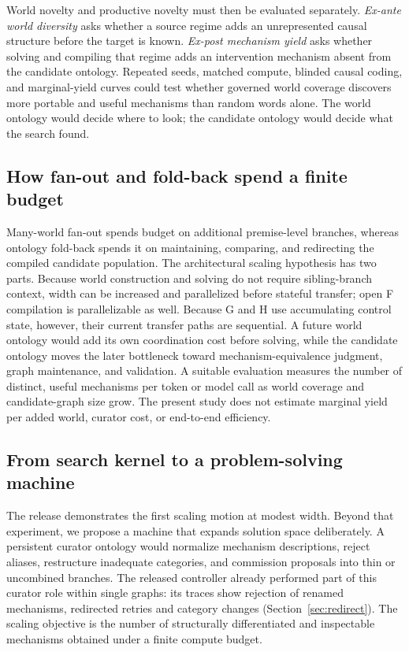 \documentclass[11pt,a4paper]{article}
\begin{document}
World novelty and productive novelty must then be evaluated separately. \emph{Ex-ante world diversity} asks whether a source regime adds an unrepresented causal structure before the target is known. \emph{Ex-post mechanism yield} asks whether solving and compiling that regime adds an intervention mechanism absent from the candidate ontology. Repeated seeds, matched compute, blinded causal coding, and marginal-yield curves could test whether governed world coverage discovers more portable and useful mechanisms than random words alone. The world ontology would decide where to look; the candidate ontology would decide what the search found.

\subsection{How fan-out and fold-back spend a finite budget}
\label{sec:budget}

Many-world fan-out spends budget on additional premise-level branches, whereas ontology fold-back spends it on maintaining, comparing, and redirecting the compiled candidate population. The architectural scaling hypothesis has two parts. Because world construction and solving do not require sibling-branch context, width can be increased and parallelized before stateful transfer; open F compilation is parallelizable as well. Because G and H use accumulating control state, however, their current transfer paths are sequential. A future world ontology would add its own coordination cost before solving, while the candidate ontology moves the later bottleneck toward mechanism-equivalence judgment, graph maintenance, and validation. A suitable evaluation measures the number of distinct, useful mechanisms per token or model call as world coverage and candidate-graph size grow. The present study does not estimate marginal yield per added world, curator cost, or end-to-end efficiency.

\subsection{From search kernel to a problem-solving machine}
\label{sec:machine}

The release demonstrates the first scaling motion at modest width. Beyond that experiment, we propose a machine that expands solution space deliberately. A persistent curator ontology would normalize mechanism descriptions, reject aliases, restructure inadequate categories, and commission proposals into thin or uncombined branches. The released controller already performed part of this curator role within single graphs: its traces show rejection of renamed mechanisms, redirected retries and category changes (Section~\ref{sec:redirect}). The scaling objective is the number of structurally differentiated and inspectable mechanisms obtained under a finite compute budget.
\end{document}

